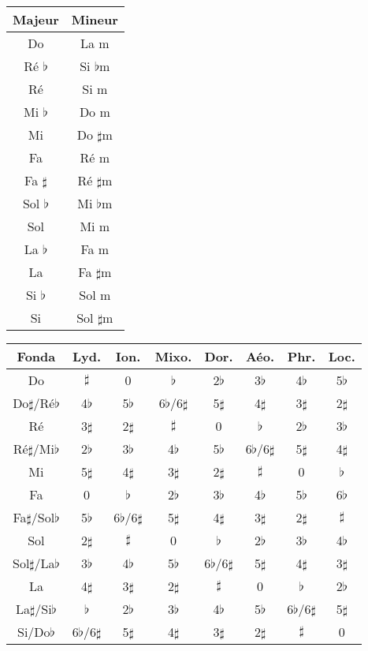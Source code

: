 \documentclass[11pt]{article}
\newcommand{\B}[0]
{$\flat$}
\newcommand{\D}[0]
{$\sharp$}
\begin{document}
\newpage

\begin{tabular}{ | *{2}{c|} }
    \hline
    Majeur & Mineur \\
    \hline
    Do & La m \\
    \hline
    Ré \B & Si \B m \\
    \hline
    Ré & Si m \\
    \hline
    Mi \B & Do m \\
    \hline
    Mi & Do \D m \\
    \hline
    Fa & Ré m \\
    \hline
    Fa \D & Ré \D m \\
    \hline
    Sol \B & Mi \B m \\
    \hline
    Sol & Mi m \\
    \hline
    La \B & Fa m \\
    \hline
    La & Fa \D m \\
    \hline
    Si \B & Sol m \\
    \hline
    Si & Sol \D m \\
    \hline
\end{tabular}

\begin{tabular}{ | *{8}{c|} }
    \hline
    Fonda & Lyd. & Ion. & Mixo. & Dor. & Aéo. & Phr. & Loc. \\
    \hline
    Do & \D & 0 & \B & 2\B & 3\B & 4\B & 5\B \\
    \hline
    Do\D/Ré\B & 4\B & 5\B & 6\B/6\D & 5\D & 4\D & 3\D & 2\D \\
    \hline
    Ré & 3\D & 2\D & \D & 0 & \B & 2\B & 3\B \\
    \hline
    Ré\D/Mi\B & 2\B & 3\B & 4\B & 5\B & 6\B/6\D & 5\D & 4\D \\
    \hline
    Mi & 5\D & 4\D & 3\D & 2\D & \D & 0 & \B \\
    \hline
    Fa & 0 & \B & 2\B & 3\B & 4\B & 5\B & 6\B \\
    \hline
    Fa\D/Sol\B & 5\B & 6\B/6\D & 5\D & 4\D & 3\D & 2\D & \D \\
    \hline
    Sol & 2\D & \D & 0 & \B & 2\B & 3\B & 4\B \\
    \hline
    Sol\D/La\B & 3\B & 4\B & 5\B & 6\B/6\D & 5\D & 4\D & 3\D \\
    \hline
    La & 4\D & 3\D & 2\D & \D & 0 & \B & 2\B \\
    \hline
    La\D/Si\B & \B & 2\B & 3\B & 4\B & 5\B & 6\B/6\D & 5\D \\
    \hline
    Si/Do\B & 6\B/6\D & 5\D & 4\D & 3\D & 2\D & \D & 0 \\
    \hline
\end{tabular}
\end{document}
